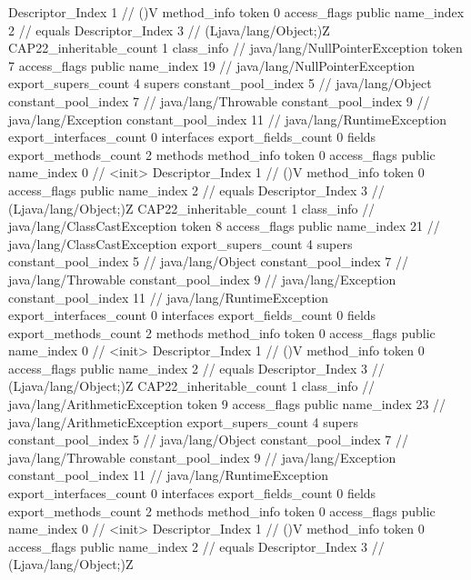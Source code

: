 {{{{{					Descriptor_Index	1		// ()V
				}
				method_info {
					token	0
					access_flags	public
					name_index	2		// equals
					Descriptor_Index	3		// (Ljava/lang/Object;)Z
				}
			}
			CAP22_inheritable_count	1
		}
		class_info {		// java/lang/NullPointerException
			token	7
			access_flags	public
			name_index	19		// java/lang/NullPointerException
			export_supers_count	4
			supers {
				constant_pool_index	5		// java/lang/Object
				constant_pool_index	7		// java/lang/Throwable
				constant_pool_index	9		// java/lang/Exception
				constant_pool_index	11		// java/lang/RuntimeException
			}
			export_interfaces_count	0
			interfaces {
			}
			export_fields_count	0
			fields {
			}
			export_methods_count	2
			methods {
				method_info {
					token	0
					access_flags	public
					name_index	0		// <init>
					Descriptor_Index	1		// ()V
				}
				method_info {
					token	0
					access_flags	public
					name_index	2		// equals
					Descriptor_Index	3		// (Ljava/lang/Object;)Z
				}
			}
			CAP22_inheritable_count	1
		}
		class_info {		// java/lang/ClassCastException
			token	8
			access_flags	public
			name_index	21		// java/lang/ClassCastException
			export_supers_count	4
			supers {
				constant_pool_index	5		// java/lang/Object
				constant_pool_index	7		// java/lang/Throwable
				constant_pool_index	9		// java/lang/Exception
				constant_pool_index	11		// java/lang/RuntimeException
			}
			export_interfaces_count	0
			interfaces {
			}
			export_fields_count	0
			fields {
			}
			export_methods_count	2
			methods {
				method_info {
					token	0
					access_flags	public
					name_index	0		// <init>
					Descriptor_Index	1		// ()V
				}
				method_info {
					token	0
					access_flags	public
					name_index	2		// equals
					Descriptor_Index	3		// (Ljava/lang/Object;)Z
				}
			}
			CAP22_inheritable_count	1
		}
		class_info {		// java/lang/ArithmeticException
			token	9
			access_flags	public
			name_index	23		// java/lang/ArithmeticException
			export_supers_count	4
			supers {
				constant_pool_index	5		// java/lang/Object
				constant_pool_index	7		// java/lang/Throwable
				constant_pool_index	9		// java/lang/Exception
				constant_pool_index	11		// java/lang/RuntimeException
			}
			export_interfaces_count	0
			interfaces {
			}
			export_fields_count	0
			fields {
			}
			export_methods_count	2
			methods {
				method_info {
					token	0
					access_flags	public
					name_index	0		// <init>
					Descriptor_Index	1		// ()V
				}
				method_info {
					token	0
					access_flags	public
					name_index	2		// equals
					Descriptor_Index	3		// (Ljava/lang/Object;)Z
}}}}}
